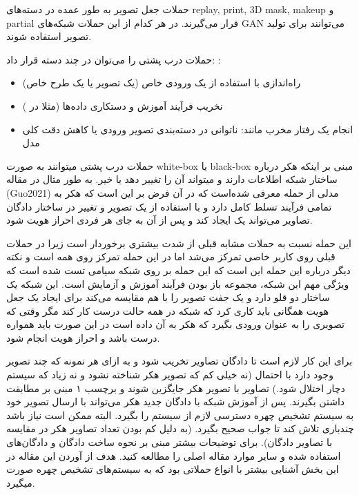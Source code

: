 حملات جعل تصویر به طور عمده در دسته‌های replay, print, 3D mask, makeup و partial قرار می‌گیرند. در هر کدام از این حملات شبکه‌های GAN می‌توانند برای تولید تصویر استفاده شوند. 

حملات درب پشتی را می‌توان در چند دسته قرار داد:
\cite{Guo2021}:
\begin{itemize}
	\item
	راه‌اندازی با استفاده از یک ورودی خاص (یک تصویر یا یک طرح خاص)
	\item
	نخریب فرآیند آموزش و دستکاری داده‌ها (مثلا در 
	)
	\item
	انجام یک رفتار مخرب مانند: ناتوانی در دسته‌بندی تصویر ورودی یا کاهش دقت کلی مدل	
\end{itemize}

حملات درب پشتی میتوانند به صورت white-box یا black-box مبنی بر اینکه هکر درباره ساختار شبکه اطلاعات دارند و میتواند آن را تغییر دهد یا خیر. به طور مثال در مقاله (Guo2021)
\cite{Guo2021}
مدلی از حمله معرفی شده‌است که در آن فرض بر این است که هکر به تمامی فرآیند تسلط کامل دارد و با استفاده از یک تصویر و تغییر در ساختار دادگان تصاویر می‌تواند یک 
ایجاد کند و پس از آن به جای هر فردی احراز هویت شود.

این حمله نسبت به حملات مشابه قبلی از شدت بیشتری برخوردار است زیرا در حملات قبلی روی کاربر خاصی تمرکز می‌شد اما در این حمله تمرکز روی همه است و نکته دیگر درباره این حمله این است که این حمله بر روی شبکه سیامی تست شده است که ویژگی مهم این شبکه، مجموعه باز بودن فرآیند آموزش و آزمایش است. این شبکه یک ساختار دو قلو دارد و یک جفت تصویر را با هم مقایسه می‌کند برای ایجاد یک جعل هویت همگانی باید کاری کرد که شبکه در همه حالت درست کار کند مگر وقتی که تصویری را به عنوان ورودی بگیرد که هکر به آن داده است در این صورت باید همواره درست باشد و احراز هویت انجام شود.


برای این کار لازم است تا دادگان تصاویر تخریب شود و به ازای هر نمونه که چند تصویر وجود دارد با احتمال (نه خیلی کم که تصویر هکر شناخته نشود و نه زیاد که سیستم دچار اختلال شود.) تصاویر با تصویر هکر جایگزین شوند و برچسب ۱ مبنی بر مطابقت داشتن بگیرند. پس از آموزش شبکه با دادگان جدید هکر می‌تواند با ارسال تصویر خود به سیستم تشخیص چهره دسترسی لازم از سیستم را بگیرد. البته ممکن است نیاز باشد چندباری تلاش کند تا جواب صحیح بگیرد. (به دلیل کم بودن تعداد تصاویر هکر در مقایسه با تصاویر دادگان). برای توضیحات بیشتر مبنی بر نحوه ساخت دادگان و دادگان‌های استفاده شده و سایر موارد مقاله اصلی
\cite{Guo2021}
را مطالعه کنید. هدف از آوردن این مقاله در این بخش آشنایی بیشتر با انواع حملاتی بود که به سیستم‌های تشخیص چهره صورت میگیرد.

